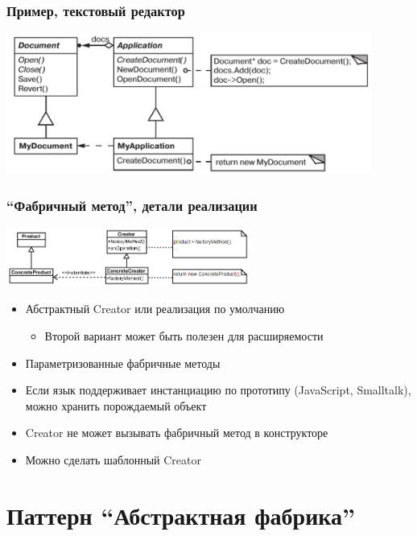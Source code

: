 \documentclass[xetex,mathserif,serif]{beamer}
\begin{document}
    \begin{frame}
        \frametitle{Пример, текстовый редактор}
        \begin{center}
            \includegraphics[width=0.9\textwidth]{factoryMethodForTextEditor.png}
        \end{center}
    \end{frame}

    \begin{frame}
        \frametitle{``Фабричный метод'', детали реализации}
        \begin{center}
            \includegraphics[width=0.6\textwidth]{factoryMethod.png}
        \end{center}
        \begin{itemize}
            \item Абстрактный Creator или реализация по умолчанию
            \begin{itemize}
                \item Второй вариант может быть полезен для расширяемости
            \end{itemize}
            \item Параметризованные фабричные методы
            \item Если язык поддерживает инстанциацию по прототипу (JavaScript, Smalltalk), можно хранить порождаемый объект
            \item Creator не может вызывать фабричный метод в конструкторе
            \item Можно сделать шаблонный Creator
        \end{itemize}
    \end{frame}

    \section{Паттерн ``Абстрактная фабрика''}
\end{document}
